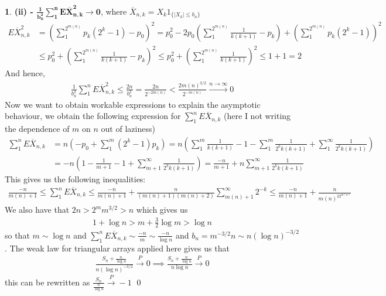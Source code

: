 \documentclass[10.5pt]{article}
\theoremstyle{definition}
\newtheorem{pb}{}
\newcommand{\set}[1]{\{#1\}}
\newcommand{\abs}[1]{\lvert#1\rvert}
\begin{document}
\begin{pb}
        \textbf{(ii) - \(\mathbf{\frac{1}{b_n^2}\sum_1^nE\overline{X}_{n,k}^2 \to 0}\)}, where \(\overline{X}_{n,k} = X_k1_{\set{\abs{X_k}\leq b_n}}\)
        \begin{align*}
            E\overline{X}_{n,k}^2 &= \left(\sum_1^{2^{m(n)}}p_k(2^k-1)-p_0\right)^2 = p_0^2 - 2p_0\left(\sum_1^{2^{m(n)}}\frac{1}{k(k+1)}-p_k\right) + \left(\sum_1^{2^{m(n)}}p_k(2^k-1)\right)^2 \\
            &\leq p_0^2 + \left(\sum_1^{2^{m(n)}}\frac{1}{k(k+1)} - p_k\right)^2 \leq p_0^2 + \left(\sum_1^{2^{m(n)}}\frac{1}{k(k+1)}\right)^2 \leq 1 + 1 = 2
        \end{align*}
        And hence,
        \begin{align*}
            \frac{1}{b_n^2}\sum_1^nE\overline{X}_{n,k}^2 \leq \frac{2n}{b_n^2} = \frac{2n}{2^{-2m(n)}} < \frac{2m(n)^{3/2}}{2^{-m(n)}} \overset{n \to \infty}{\longrightarrow} 0
        \end{align*}
        Now we want to obtain workable expressions to explain the asymptotic behaviour, we obtain the following expression for \(\sum_1^n E \overline{X}_{n,k}\) (here I not writing the dependence of \(m\) on \(n\) out of laziness)
        \begin{align*}
            \sum_1^n E \overline{X}_{n,k} &= n\left(-p_0 + \sum_1^m (2^k - 1)p_k\right) = n\left(\sum_1^m \frac{1}{k(k+1)} - 1 - \sum_1^m \frac{1}{2^k k(k+1)} + \sum_1^\infty \frac{1}{2^k k(k+1)}\right) \\ &= -n\left(1 - \frac{1}{m+1} - 1 + \sum_{m+1}^\infty \frac{1}{2^k k(k+1)}\right) = \frac{-n}{m+1} +n\sum_{m+1}^\infty \frac{1}{2^kk(k+1)}
        \end{align*}
        This gives us the following inequalities:
        \begin{align}
            \frac{-n}{m(n)+1} \leq \sum_1^n E \overline{X}_{n,k} \leq \frac{-n}{m(n)+1} + \frac{n}{(m(n)+1)(m(n)+2)}\sum_{m(n)+1}^\infty 2^{-k} \leq \frac{-n}{m(n)+1} + \frac{n}{m(n)^22^{m(n)}}
        \end{align}
        We also have that \(2n > 2^mm^{3/2}>n\) which gives us
        \begin{align}
            1 + \log n > m + \frac32 \log m > \log n
        \end{align}
        so that \(m \sim \log n\) and \(\sum_1^n E \overline{X}_{n,k} \sim \frac{-n}{m} \sim \frac{-n}{\log n}\) and \(b_n = m^{-3/2}n \sim n(\log n)^{-3/2}\). The weak law for triangular arrays applied here gives us that
        \begin{align*}
            \frac{S_n + \frac{n}{\log n}}{n(\log n)^{-3/2}} \overset{P}{\longrightarrow} 0 \implies \frac{S_n + \frac{n}{\log n}}{n\log n} \overset{P}{\longrightarrow} 0
        \end{align*}
        this can be rewritten as \(\frac{S_n}{\frac{n}{\log n}} \overset{P}{\to} -1\) \qed
    \end{pb}
\end{document}
